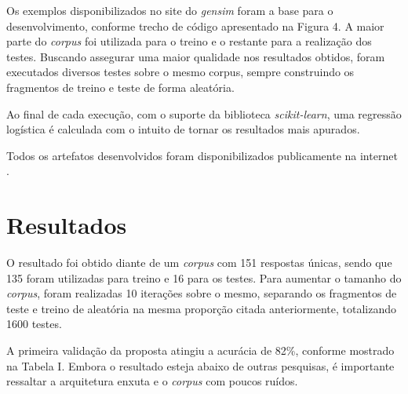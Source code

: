 \documentclass[conference]{IEEEtran}
\begin{document}
Os exemplos disponibilizados no site do \textit{gensim} foram a base para o desenvolvimento, conforme trecho de código apresentado na Figura 4. A maior parte do \textit{corpus} foi utilizada para o treino e o restante para a realização dos testes. Buscando assegurar uma maior qualidade nos resultados obtidos, foram executados diversos testes sobre o mesmo corpus, sempre construindo os fragmentos de treino e teste de forma aleatória.

Ao final de cada execução, com o suporte da biblioteca \textit{scikit-learn}, uma regressão logística é calculada com o intuito de tornar os resultados mais apurados.

Todos os artefatos desenvolvidos foram disponibilizados publicamente na internet \cite{Comelli:2016}.


\section{Resultados}
O resultado foi obtido diante de um \textit{corpus} com 151 respostas únicas, sendo que 135 foram utilizadas para treino e 16 para os testes. Para aumentar o tamanho do \textit{corpus}, foram realizadas 10 iterações sobre o mesmo, separando os fragmentos de teste e treino de aleatória na mesma proporção citada anteriormente, totalizando 1600 testes.

A primeira validação da proposta atingiu a acurácia de 82\%, conforme mostrado na Tabela I. Embora o resultado esteja abaixo de outras pesquisas, é importante ressaltar a arquitetura enxuta e o \textit{corpus} com poucos ruídos.
\end{document}
